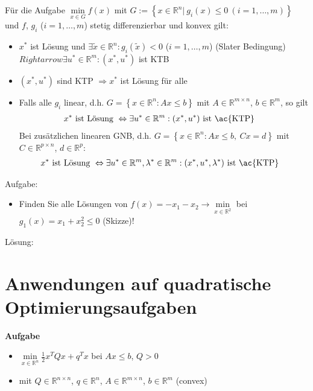 \begin{satz}\label{satz:5}
Für die Aufgabe $\min\limits_{x\in G}f(x)$ mit $G:=\left\{ x\in\mathbb{R}^n|\ g_i(x)\le 0\ (i=1,\ldots,m) \right\}$ und $f$, $g_i$ ($i=1,\ldots,m$) stetig differenzierbar und konvex
gilt:
\begin{itemize}
  \item $x^{\ast}$ ist Lösung und $\exists\tilde{x}\in\mathbb{R}^n:g_i(\tilde{x})<0$ ($i=1,\ldots,m$) (Slater Bedingung)\\
  $Rightarrow \exists u^{\ast}\in\mathbb{R}^m:(x^{\ast},u^{\ast})$ ist \ac{KTB}
  \item $(x^{\ast},u^{\ast})$ sind \ac{KTP} $\Rightarrow x^{\ast}$ ist Lösung für alle
  \item Falls alle $g_i$ linear, d.h. $G=\left\{x\in\mathbb{R}^n:Ax\le b \right\}$ mit $A\in\mathbb{R}^{m\times n}$, $b\in\mathbb{R}^m$, so gilt
  \begin{align*}
  	x^{\ast}\text{ ist Lösung } &\Leftrightarrow \exists u^{\ast}\in\mathbb{R}^m:(x^{\ast},u^{\ast})\text{ ist \ac{KTP}}
  \end{align*}
  Bei zusätzlichen linearen \ac{GNB}, d.h. $G=\left\{x\in\mathbb{R}^n:Ax\le b,\ Cx=d \right\}$ mit $C\in\mathbb{R}^{p\times n}$, $d\in\mathbb{R}^p$:
  \begin{align*}
  	x^{\ast}\text{ ist Lösung } &\Leftrightarrow \exists u^{\ast}\in\mathbb{R}^m,\lambda^{\ast}\in\mathbb{R}^m:(x^{\ast},u^{\ast},\lambda^{\ast})\text{ ist \ac{KTP}}
  \end{align*}
\end{itemize}
\end{satz}

\begin{uea}
Aufgabe: 
\begin{itemize}
  \item[] Finden Sie alle Lösungen von $f(x)=-x_1-x_2\rightarrow\min\limits_{x\in\mathbb{R}^2}$ bei $g_1(x)=x_1+x_2^2\le 0$ (Skizze)!
\end{itemize}
Lösung: 
\end{uea}

\section{Anwendungen auf quadratische Optimierungsaufgaben}
\textbf{Aufgabe}
\begin{itemize}
	\item[] $\min\limits_{x\in\mathbb{R}^n} \frac12 x^TQx+q^Tx$ bei $Ax\le b$, $Q>0$
	\item[] mit $Q\in\mathbb{R}^{n\times n}$, $q\in\mathbb{R}^n$, $A\in\mathbb{R}^{m\times n}$, $b\in\mathbb{R}^m$ (convex) 
\end{itemize}
